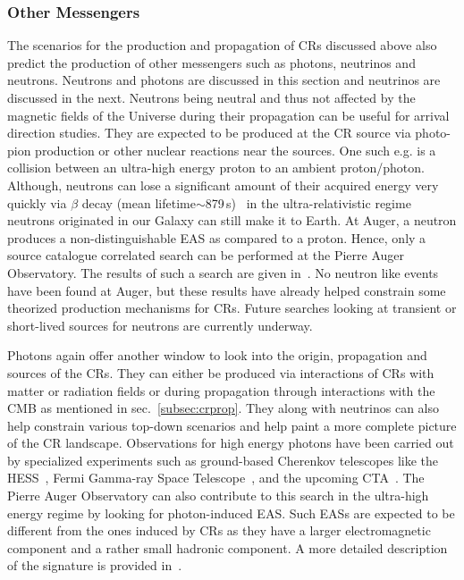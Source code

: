 \subsubsection*{Other Messengers}
\label{subsubsec:CRmessengers}
The scenarios for the production and propagation of \glspl{CR} discussed above also predict the production of other messengers such as photons, neutrinos and neutrons. Neutrons and photons are discussed in this section and neutrinos are discussed in the next. 
Neutrons being neutral and thus not affected by the magnetic fields of the Universe during their propagation can be useful for arrival direction studies. They are expected to be produced at the CR source via photo-pion production or other nuclear reactions near the sources. One such e.g. is a collision between an ultra-high energy proton to an ambient proton/photon. Although, neutrons can lose a significant amount of their acquired energy very quickly via $\beta$ decay (mean lifetime$\sim$879\,s)~\cite{ParticleDataGroup:2024cfk} in the ultra-relativistic regime neutrons originated in our Galaxy can still make it to Earth. At Auger, a neutron produces a non-distinguishable EAS as compared to a proton. Hence, only a source catalogue correlated search can be performed at the Pierre Auger Observatory. The results of such a search are given in~\cite{PierreAuger:2023onx}. No neutron like events have been found at Auger, but these results have already helped constrain some theorized production mechanisms for \glspl{CR}. Future searches looking at transient or short-lived sources for neutrons are currently underway. 

Photons again offer another window to look into the origin, propagation and sources of the \glspl*{CR}. They can either be produced via interactions of \glspl*{CR} with matter or radiation fields or during propagation through interactions with the \gls*{CMB} as mentioned in sec.~\ref{subsec:crprop}. They along with neutrinos can also help constrain various top-down scenarios and help paint a more complete picture of the CR landscape. Observations for high energy photons have been carried out by specialized experiments such as ground-based Cherenkov telescopes like the \gls{HESS}~\cite{Puhlhofer:2024fjx}, Fermi Gamma-ray Space Telescope~\cite{Thompson_2022}, and the upcoming \gls{CTA}~\cite{2018_CTAO}. The Pierre Auger Observatory can also contribute to this search in the ultra-high energy regime by looking for photon-induced EAS. Such EASs are expected to be different from the ones induced by \glspl{CR} as they have a larger electromagnetic component and a rather small hadronic component. A more detailed description of the signature is provided in~\cite{universe8110579}. 


